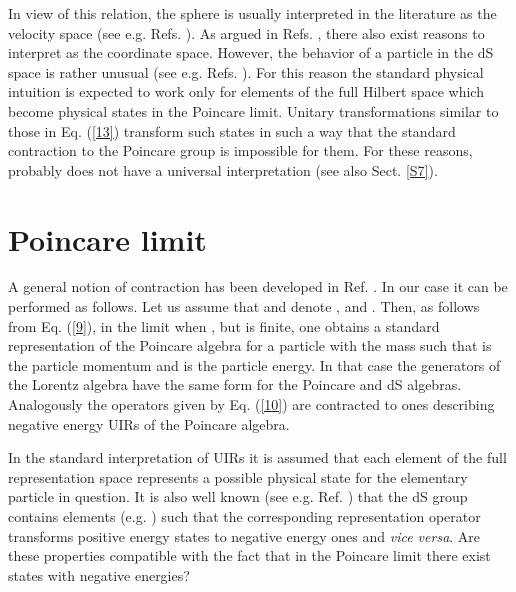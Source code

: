 \documentclass[a4paper,12pt]{article}%
\begin{document}
In view of this relation, the
sphere \coordHE{} is usually interpreted in the literature as the
velocity space (see e.g. Refs. \cite{Men,Dobrev,Moy,Mielke}). 
As argued
in Refs. \cite{lev1,lev1a,lev3}, there also exist reasons 
to interpret
\coordHE{} as the coordinate space. However, the behavior of a particle
in the dS space is rather unusual (see e.g. Refs.
\cite{Men,Mielke,Narlikar}). For this reason the standard 
physical intuition
is expected to work only for elements of the full 
Hilbert space
which become physical states in the Poincare limit. 
Unitary transformations 
similar to those in Eq. (\ref{13}) transform such states in
such a way that the standard contraction to the 
Poincare group 
is impossible for them. For these reasons, \coordHE{} probably 
does not have
a universal interpretation (see also Sect. \ref{S7}). 

\section{Poincare limit}
\label{S3}

A general notion of contraction has been developed in 
Ref. \cite{IW}. In our case it can be performed
as follows. Let us assume that \coordHE{} and denote
\coordHE{}, \coordHE{} and \coordHE{}.
Then, as follows from  Eq. (\ref{9}), in the limit
when \coordHE{}, \myHighlight{$\mu\rightarrow \infty$}\coordHE{}
but \coordHE{} is finite,   
one obtains a standard representation of the
Poincare algebra for a particle with the mass \coordHE{} such 
that \coordHE{} is the particle momentum
and \coordHE{} is the particle energy. In that case
the generators of the Lorentz algebra have the same form
for the Poincare and dS algebras. Analogously the
operators given by Eq. (\ref{10}) are contracted to
ones describing negative energy UIRs of the Poincare
algebra.

In the standard interpretation of UIRs
it is assumed that each element of the full 
representation space represents a possible physical
state for the elementary particle in question. 
It is also well known (see e.g. Ref. 
\cite{Dobrev,Men,Moy,Mielke})
that the dS group contains elements (e.g. \coordHE{})
such that the corresponding representation operator
transforms positive energy states to negative energy
ones and {\it vice versa}. Are these properties 
compatible with the fact that in the Poincare
limit there exist states with negative energies?
\end{document}
